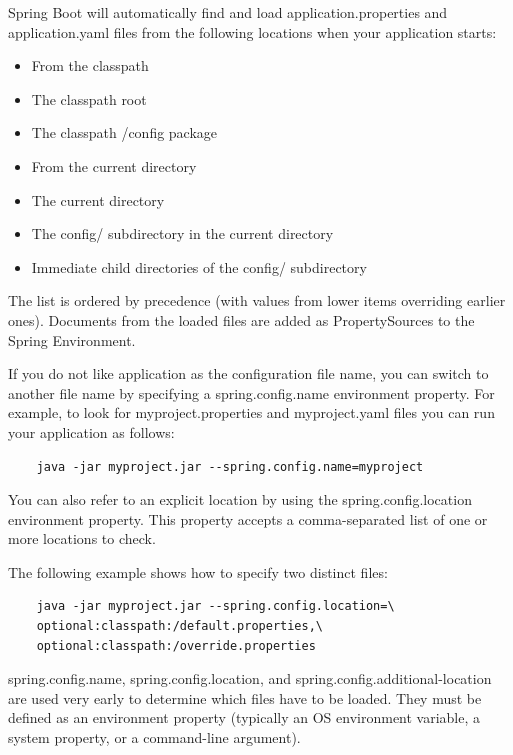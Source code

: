\documentclass{scrartcl}
\begin{document}
Spring Boot will automatically find and load application.properties and application.yaml files from the following locations when your application starts:

\begin{itemize}
    \item From the classpath
    \item The classpath root
    \item The classpath /config package
    \item From the current directory
    \item The current directory
    \item The config/ subdirectory in the current directory
    \item Immediate child directories of the config/ subdirectory
\end{itemize}

The list is ordered by precedence (with values from lower items overriding earlier ones). Documents from the loaded files are added as PropertySources to the Spring Environment.

If you do not like application as the configuration file name, you can switch to another file name by specifying a spring.config.name environment property. For example, to look for myproject.properties and myproject.yaml files you can run your application as follows:

\begin{lstlisting}
    java -jar myproject.jar --spring.config.name=myproject
\end{lstlisting}

You can also refer to an explicit location by using the spring.config.location environment property. This property accepts a comma-separated list of one or more locations to check.

The following example shows how to specify two distinct files:

\begin{lstlisting}
    java -jar myproject.jar --spring.config.location=\
    optional:classpath:/default.properties,\
    optional:classpath:/override.properties
\end{lstlisting}

spring.config.name, spring.config.location, and spring.config.additional-location are used very early to determine which files have to be loaded. They must be defined as an environment property (typically an OS environment variable, a system property, or a command-line argument).
\end{document}

